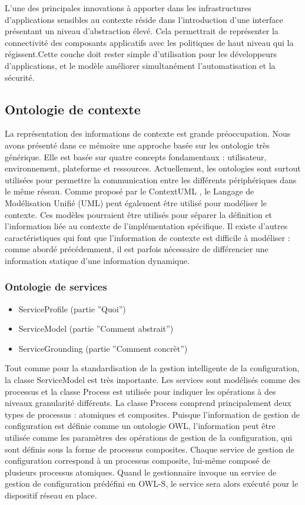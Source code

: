 L'une des principales innovations à apporter dans les infrastructures
d'applications sensibles au contexte réside dans l'introduction d'une interface
présentant un niveau d'abstraction élevé. Cela permettrait de représenter la
connectivité des composants applicatifs avec les politiques de haut niveau qui
la régissent.Cette couche doit rester simple d'utilisation pour les
développeurs d'applications, et le modèle améliorer simultanément
l'automatisation et la sécurité.

\subsection{Ontologie de contexte}

La représentation des informations de contexte est grande préoccupation. Nous
avons présenté dans ce mémoire une approche basée sur les ontologie très
générique. Elle est basée sur quatre concepts fondamentaux : utilisateur,
environnement, plateforme et ressources. Actuellement, les ontologies sont
surtout utilisées pour permettre la communication entre les différents
périphériques dans le même réseau. Comme proposé par le ContextUML
\cite{sheng_contextuml:_2005}, le Langage de Modélisation Unifié (UML) peut
également être utilisé pour modéliser le contexte. Ces modèles pourraient être
utilisés pour séparer la définition et l'information liée au contexte de
l'implémentation spécifique. Il existe d'autres caractéristiques qui font que
l'information de contexte est difficile à modéliser : comme abordé précédemment,
il est parfois nécessaire de différencier une information statique d'une
information dynamique.

\subsubsection{Ontologie de services}

\begin{itemize}
  \item ServiceProfile (partie ''Quoi'')
  \item ServiceModel (partie ''Comment abstrait'')
  \item ServiceGrounding (partie ''Comment concrèt'')
\end{itemize}

Tout comme pour la standardisation de la gestion intelligente de la
configuration, la classe ServiceModel est très importante. Les services sont
modélisés comme des processus et la classe Process est utilisée pour indiquer
les opérations à des niveaux granularité différents. La classe Process comprend
principalement deux types de processus : atomiques et composites. Puisque
l'information de gestion de configuration est définie comme un ontologie OWL,
l'information peut être utilisée comme les paramètres des opérations de gestion
de la configuration, qui sont définis sous la forme de processus composites.
Chaque service de gestion de configuration correspond à un processus composite,
lui-même composé de plusieurs processus atomiques. Quand le gestionnaire invoque
un service de gestion de configuration prédéfini en OWL-S, le service sera alors
exécuté pour le dispositif réseau en place.

